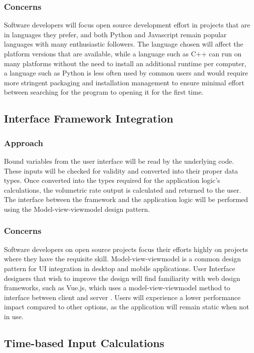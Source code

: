 \documentclass[onecolumn, draftclsnofoot,10pt, compsoc]{IEEEtran}
\begin{document}
\subsubsection{Concerns}
Software developers will focus open source development effort in projects that are in languages they prefer, and both Python and Javascript remain popular languages with many enthusiastic followers.
The language chosen will affect the platform versions that are available, while a language such as C++ can run on many platforms without the need to install an additional runtime per computer, a language such as Python is less often used by common users and would require more stringent packaging and installation management to ensure minimal effort between searching for the program to opening it for the first time.

\subsection{Interface Framework Integration}
\subsubsection{Approach}
Bound variables from the user interface will be read by the underlying code.
These inputs will be checked for validity and converted into their proper data types.
Once converted into the types required for the application logic's calculations, the volumetric rate output is calculated and returned to the user.
The interface between the framework and the application logic will be performed using the Model-view-viewmodel design pattern.
\subsubsection{Concerns}
Software developers on open source projects focus their efforts highly on projects where they have the requisite skill.
Model-view-viewmodel is a common design pattern for UI integration in desktop and mobile applications. 
User Interface designers that wish to improve the design will find familiarity with web design frameworks, such as Vue.js, which uses a model-view-viewmodel method to interface between client and server \autocite{mvvm}.
Users will experience a lower performance impact compared to other options, as the application will remain static when not in use.

\subsection{Time-based Input Calculations}
\end{document}
